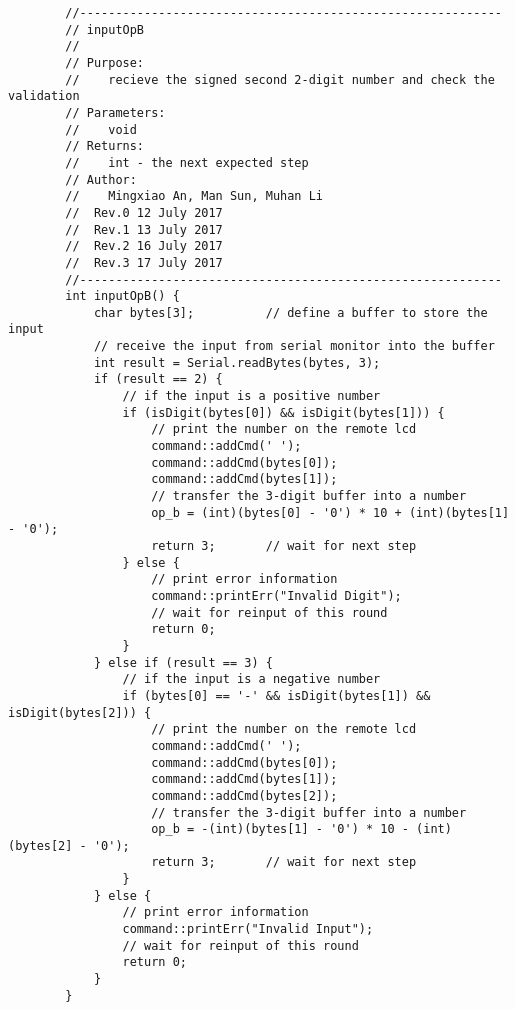 \begin{verbatim}
        //-----------------------------------------------------------  
        // inputOpB 
        //  
        // Purpose:  
        //    recieve the signed second 2-digit number and check the validation
        // Parameters:  
        //    void 
        // Returns:  
        //    int - the next expected step   
        // Author:  
        //    Mingxiao An, Man Sun, Muhan Li
        //  Rev.0 12 July 2017
        //  Rev.1 13 July 2017
        //  Rev.2 16 July 2017
        //  Rev.3 17 July 2017
        //-----------------------------------------------------------
        int inputOpB() {
            char bytes[3];          // define a buffer to store the input
            // receive the input from serial monitor into the buffer
            int result = Serial.readBytes(bytes, 3);
            if (result == 2) {
                // if the input is a positive number
                if (isDigit(bytes[0]) && isDigit(bytes[1])) {
                    // print the number on the remote lcd
                    command::addCmd(' ');
                    command::addCmd(bytes[0]);
                    command::addCmd(bytes[1]);
                    // transfer the 3-digit buffer into a number
                    op_b = (int)(bytes[0] - '0') * 10 + (int)(bytes[1] - '0');
                    return 3;       // wait for next step
                } else {
                    // print error information
                    command::printErr("Invalid Digit");
                    // wait for reinput of this round
                    return 0;
                }
            } else if (result == 3) {
                // if the input is a negative number
                if (bytes[0] == '-' && isDigit(bytes[1]) && isDigit(bytes[2])) {
                    // print the number on the remote lcd
                    command::addCmd(' ');
                    command::addCmd(bytes[0]);
                    command::addCmd(bytes[1]);
                    command::addCmd(bytes[2]);
                    // transfer the 3-digit buffer into a number
                    op_b = -(int)(bytes[1] - '0') * 10 - (int)(bytes[2] - '0');
                    return 3;       // wait for next step
                }
            } else {
                // print error information
                command::printErr("Invalid Input");
                // wait for reinput of this round
                return 0;
            }
        }


\end{verbatim}
